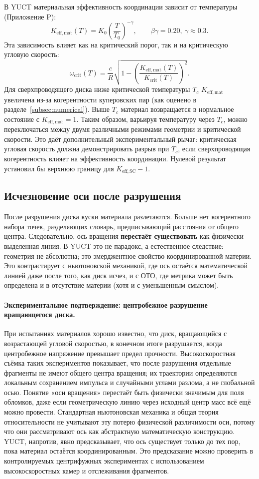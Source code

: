 \documentclass[12pt,a4paper]{article}
\begin{document}
	В YUCT материальная эффективность координации зависит от температуры (Приложение P):
	\[
	K_{\mathrm{eff,mat}}(T) = K_0 \left( \frac{T}{T_0} \right)^{-\gamma}, \qquad \beta\gamma = 0.20,\ \gamma \approx 0.3.
	\]
	Эта зависимость влияет как на критический порог, так и на критическую угловую скорость:
	\[
	\omega_{\text{crit}}(T) = \frac{c}{R} \sqrt{1 - \left( \frac{K_{\mathrm{eff,mat}}(T)}{K_{\mathrm{crit}}(T)} \right)^2 }.
	\]
	Для сверхпроводящего диска ниже критической температуры \(T_c\) \(K_{\mathrm{eff,mat}}\) увеличена из-за когерентности куперовских пар (как оценено в разделе~\ref{subsec:numerical}). Выше \(T_c\) материал возвращается в нормальное состояние с \(K_{\mathrm{eff,mat}} = 1\). Таким образом, варьируя температуру через \(T_c\), можно переключаться между двумя различными режимами геометрии и критической скорости. Это даёт дополнительный экспериментальный рычаг: критическая угловая скорость должна демонстрировать разрыв при \(T_c\), если сверхпроводящая когерентность влияет на эффективность координации. Нулевой результат установил бы верхнюю границу для \(K_{\mathrm{eff,SC}} - 1\).
	
	\subsection{Исчезновение оси после разрушения}
	
	После разрушения диска куски материала разлетаются. Больше нет когерентного набора точек, разделяющих словарь, предписывающий расстояния от общего центра. Следовательно, ось вращения \textbf{перестаёт существовать} как физически выделенная линия. В YUCT это не парадокс, а естественное следствие: геометрия не абсолютна; это эмерджентное свойство координированной материи. Это контрастирует с ньютоновской механикой, где ось остаётся математической линией даже после того, как диск исчез, и с ОТО, где метрика может быть определена и в отсутствие материи (хотя и с уменьшенным смыслом).
	
	\paragraph{Экспериментальное подтверждение: центробежное разрушение вращающегося диска.}
	При испытаниях материалов хорошо известно, что диск, вращающийся с возрастающей угловой скоростью, в конечном итоге разрушается, когда центробежное напряжение превышает предел прочности. Высокоскоростная съёмка таких экспериментов показывает, что после разрушения отдельные фрагменты не имеют общего центра вращения; их траектории определяются локальным сохранением импульса и случайными углами разлома, а не глобальной осью. Понятие «оси вращения» перестаёт быть физически значимым для поля обломков, даже если геометрическую линию через исходный центр масс всё ещё можно провести. Стандартная ньютоновская механика и общая теория относительности не учитывают эту потерю физической различимости оси, потому что они рассматривают ось как абстрактную математическую конструкцию. YUCT, напротив, явно предсказывает, что ось существует только до тех пор, пока материал остаётся координированным. Это предсказание можно проверить в контролируемых центрифужных экспериментах с использованием высокоскоростных камер и отслеживания фрагментов.
	
\end{document}
